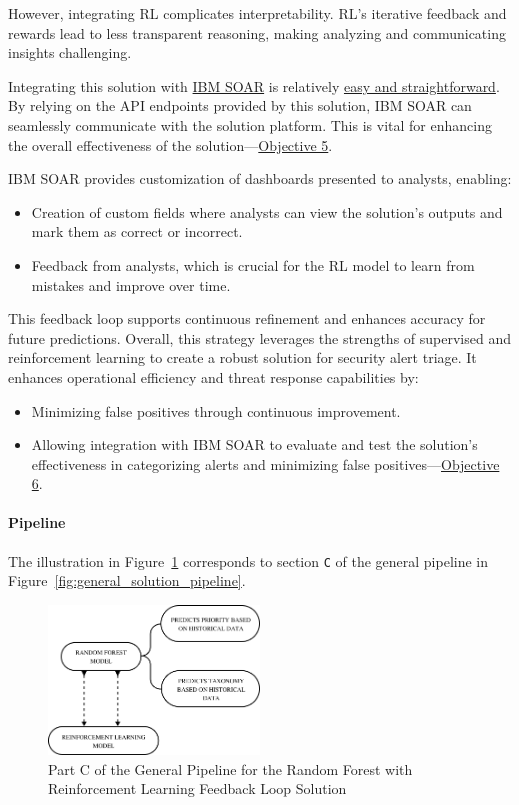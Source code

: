 However, integrating RL complicates interpretability. RL's iterative feedback and rewards lead to less transparent reasoning, making analyzing and communicating insights challenging.

Integrating this solution with \underline{IBM SOAR} is relatively \underline{easy and straightforward}. 
By relying on the API endpoints provided by this solution, IBM SOAR can seamlessly communicate with the solution platform.
This is vital for enhancing the overall effectiveness of the solution—\hyperref[objective5]{Objective 5}. 

IBM SOAR provides customization of dashboards presented to analysts, enabling:

\begin{itemize}
    \item Creation of custom fields where analysts can view the solution's outputs and mark them as correct or incorrect.
    \item Feedback from analysts, which is crucial for the RL model to learn from mistakes and improve over time.
\end{itemize}

This feedback loop supports continuous refinement and enhances accuracy for future predictions. 
Overall, this strategy leverages the strengths of supervised and reinforcement learning to create a robust solution for security alert triage. 
It enhances operational efficiency and threat response capabilities by:

\begin{itemize}
    \item Minimizing false positives through continuous improvement.
    \item Allowing integration with IBM SOAR to evaluate and test the solution's effectiveness in categorizing alerts and minimizing false positives—\hyperref[objective6]{Objective 6}.
\end{itemize}

\paragraph{Pipeline} 

The illustration in Figure~\ref{fig:solution1_c} corresponds to section \texttt{C} of the general pipeline in Figure~\ref{fig:general_solution_pipeline}. 

\begin{figure}[h!]
    \centering
    \includegraphics[width=0.5\textwidth]{ch3/assets/solution1_C.png}
    \caption{Part C of the General Pipeline for the Random Forest with Reinforcement Learning Feedback Loop Solution}
    \label{fig:solution1_c}
\end{figure}

